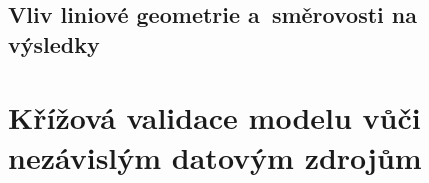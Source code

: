 \subsection{Vliv liniové geometrie a~směrovosti na výsledky}
\label{subsec:line-vs-point}
%
%
%
%


\section{Křížová validace modelu vůči nezávislým datovým zdrojům}
\label{sec:krizova-validace}


